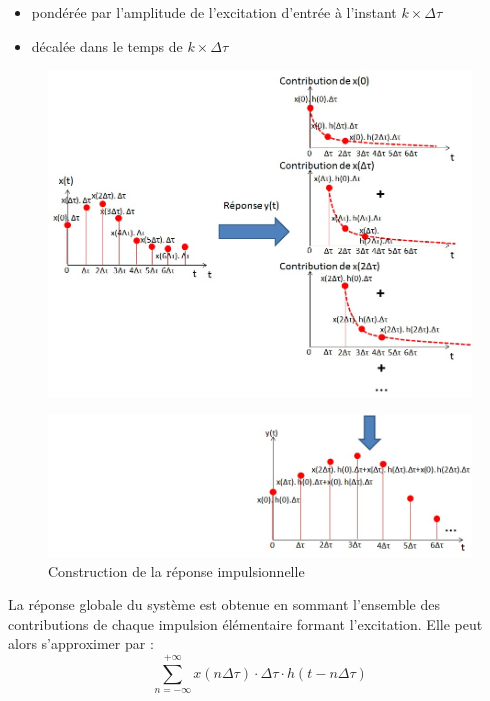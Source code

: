 	\begin{itemize}
		\item pondérée par l'amplitude de l'excitation d'entrée à l'instant $ k \times \Delta \tau $
	
		\item décalée dans le temps de $ k \times \Delta \tau $~
	\end{itemize}
	\begin{figure}[h!]
		\centering
		\includegraphics[scale=0.5]{images/illustration_reponse_impuls.jpg} 
	\end{figure}
	\begin{figure}[h!]
		\centering
		\includegraphics[scale=0.6]{images/illustration_reponse_impuls_2.jpg}
		\caption{Construction de la réponse impulsionnelle}	
		\label{Fig:illustration_reponse_impuls_2} 
	\end{figure}

	La réponse globale du système est obtenue en sommant l'ensemble des contributions de chaque impulsion élémentaire formant l'excitation. Elle peut alors s'approximer par : 
	\begin{equation*}\label{key}
	\sum_{n=-\infty}^{+\infty} x(n\Delta \tau) \cdot \Delta \tau \cdot h(t-n\Delta \tau)
	\end{equation*}
	
